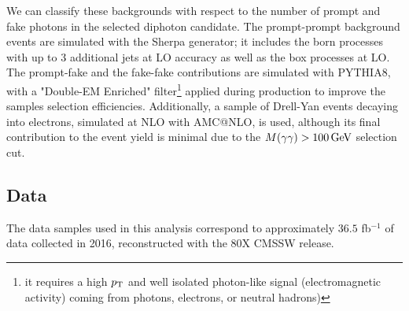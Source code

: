 We can classify these backgrounds with respect to the number of prompt and fake photons in the selected diphoton candidate. The prompt-prompt background events are simulated with the Sherpa generator; it includes the born processes with up to 3 additional jets at LO accuracy as well as the box processes at LO. The prompt-fake and the fake-fake contributions are simulated with PYTHIA8, with a "Double-EM Enriched" filter\footnote{it requires a high $p_{\mathrm{T}}$ and well isolated photon-like signal (electromagnetic activity) coming from photons, electrons, or neutral hadrons)} applied during production to improve the samples selection efficiencies. Additionally, a sample of Drell-Yan events decaying into electrons, simulated at NLO with AMC@NLO, is used, although its final contribution to the event yield is minimal due to the $M(\gamma\gamma) > 100 \,\text{Ge\hspace{-.08em}V}$ selection cut.

\subsection{Data}

The data samples used in this analysis correspond to approximately $36.5$ fb$^{-1}$ of data collected in 2016, reconstructed with the 80X CMSSW release.

